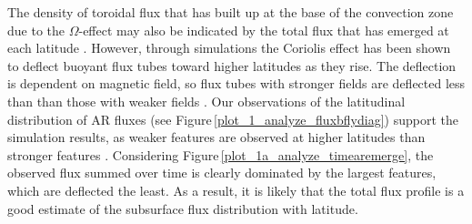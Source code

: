\documentclass[namedreferences]{solarphysics}
\begin{document}
\begin{article}
The density of toroidal flux that has built up at the base of the convection zone due to the $\Omega$-effect may also be indicated by the total flux that has emerged at each latitude \citep{Charbonneau:2010}. However, through simulations the Coriolis effect has been shown to deflect buoyant flux tubes toward higher latitudes as they rise. The deflection is dependent on magnetic field, so flux tubes with stronger fields are deflected less than than those with weaker fields \citep[][and references therein]{Fan:2009}. 
Our observations of the latitudinal distribution of AR fluxes (see Figure\,\ref{plot_1_analyze_fluxbflydiag}) support the simulation results, as weaker features are observed at higher latitudes than stronger features \citep[this has also been observed by, e.g.,][]{tang:1984,harvey:1993,meunier:2003}. Considering Figure\,\ref{plot_1a_analyze_timearemerge}, the observed flux summed over time is clearly dominated by the largest features, which are deflected the least. As a result, it is likely that the total flux profile is a good estimate of the subsurface flux distribution with latitude.





\end{article}
\end{document}
